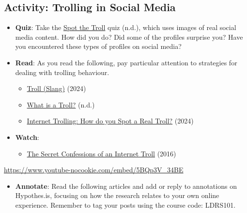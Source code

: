 \documentclass[
  letterpaper,
  DIV=11,
  numbers=noendperiod]{scrreprt}
\providecommand{\tightlist}{%
  \setlength{\itemsep}{0pt}\setlength{\parskip}{0pt}}\usepackage{longtable,booktabs,array}
\begin{document}
\subsection{Activity: Trolling in Social
Media}\label{activity-trolling-in-social-media}

\begin{tcolorbox}[enhanced jigsaw, toprule=.15mm, colback=white, colframe=quarto-callout-note-color-frame, bottomtitle=1mm, leftrule=.75mm, coltitle=black, titlerule=0mm, rightrule=.15mm, colbacktitle=quarto-callout-note-color!10!white, left=2mm, title={Learning Activity}, opacitybacktitle=0.6, opacityback=0, breakable, toptitle=1mm, arc=.35mm, bottomrule=.15mm]

\begin{itemize}
\tightlist
\item
  \textbf{Quiz}: Take the \href{https://spotthetroll.org/}{Spot the
  Troll} quiz (n.d.), which uses images of real social media content.
  How did you do? Did some of the profiles surprise you? Have you
  encountered these types of profiles on social media?
\item
  \textbf{Read}: As you read the following, pay particular attention to
  strategies for dealing with trolling behaviour.

  \begin{itemize}
  \tightlist
  \item
    \href{https://en.wikipedia.org/wiki/Troll_(slang)\%7Btarget=\%22_blank\%22\%7D}{Troll
    (Slang)} (2024)
  \item
    \href{https://meta.wikimedia.org/wiki/What_is_a_troll}{What is a
    Troll?} (n.d.)
  \item
    \href{https://www.lifewire.com/what-is-internet-trolling-3485891}{Internet
    Trolling: How do you Spot a Real Troll?} (2024)
  \end{itemize}
\item
  \textbf{Watch}:

  \begin{itemize}
  \tightlist
  \item
    \href{https://www.youtube.com/watch?v=5BQp3V_34BE}{The Secret
    Confessions of an Internet Troll} (2016)
  \end{itemize}
\end{itemize}

\url{https://www.youtube-nocookie.com/embed/5BQp3V_34BE}

\begin{itemize}
\tightlist
\item
  \textbf{Annotate}: Read the following articles and add or reply to
  annotations on Hypothes.is, focusing on how the research relates to
  your own online experience. Remember to tag your posts using the
  course code: LDRS101.


\end{itemize}
\end{tcolorbox}
\end{document}
